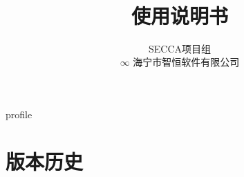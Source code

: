 \documentclass[CJK, hyperref, oneside]{z-book}
\title {\modtitle \\ \modsubtitle \\ 使用说明书}
\author{SECCA项目组 \\ $\infty$ \small{海宁市智恒软件有限公司}}
\begin{document}
\maketitle

\renewcommand\contentsname{目录/Contents}
\tableofcontents
{
    \let\clearpage\relax
    \listoftables
    \listoffigures
}
\clearpage

\def\DIRNAME{.}
{profile}

\appendix

\chapter{版本历史}
{
    \centering
    
}
\end{document}
